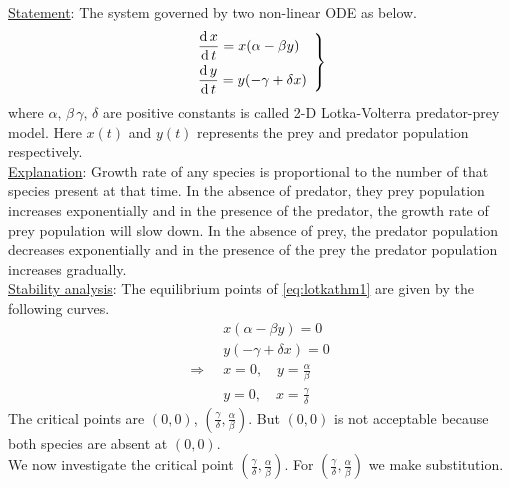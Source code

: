 \documentclass[../main-sheet.tex]{subfiles}
\begin{document}
\begin{soln}
    \underline{Statement}: The system governed by two non-linear ODE as below.
    \begin{equation}
        \begin{rcases}
            \displaystyle\,\frac{\mathrm{d}\,x}{\mathrm{d}\,t}=x(\alpha-\beta y)\quad\\
            \displaystyle\,\frac{\mathrm{d}\,y}{\mathrm{d}\,t}=y(-\gamma+\delta x)
        \end{rcases}
        \label{eq:lotkathm1}
    \end{equation}
    where \(\alpha,\,\beta\,\gamma,\,\delta\) are positive constants is called 2-D Lotka-Volterra predator-prey model. Here \(x(t)\) and \(y(t)\) represents the prey and predator population respectively.\\

    \underline{Explanation}: Growth rate of any species is proportional to the number of that species present at that time. In the absence of predator, they prey population increases exponentially and in the presence of the predator, the growth rate of prey population will slow down. In the absence of prey, the predator population decreases exponentially and in the presence of the prey the predator population increases gradually.\\

    \underline{Stability analysis}: The equilibrium points of \eqref{eq:lotkathm1} are given by the following curves.
    \begin{align*}
        &x(\alpha-\beta y)=0\\
        &y(-\gamma+\delta x)=0\\
        \Rightarrow\;\;&x=0,\quad y=\frac{\alpha}{\beta}\\
        &y=0,\quad x=\frac{\gamma}{\delta}
    \end{align*}
    The critical points are \((0,0)\), \((\frac{\gamma}{\delta},\frac{\alpha}{\beta})\). But \((0,0)\) is not acceptable because both species are absent at \((0,0)\).\\
    We now investigate the critical point \((\frac{\gamma}{\delta},\frac{\alpha}{\beta})\). For \((\frac{\gamma}{\delta},\frac{\alpha}{\beta})\) we make substitution.


\end{soln}
\end{document}
